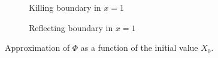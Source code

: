 \begin{figure}[t]
    \centering
    \begin{subfigure}{0.49\linewidth}
        \centering
        \resizebox{1\linewidth}{!}{ }  
        \caption{Killing boundary in $x = 1$}
        \label{fig:KillPhiProfiles}
    \end{subfigure}
    \begin{subfigure}{0.49\linewidth}
        \centering
        \resizebox{1\linewidth}{!}{ }  
        \caption{Reflecting boundary in $x = 1$}
        \label{fig:ReflectPhiProfiles}
    \end{subfigure}    
    \caption{Approximation of $\Phi$ as a function of the initial value $X_0$.}
    \label{fig:PhiProfiles}
\end{figure}


